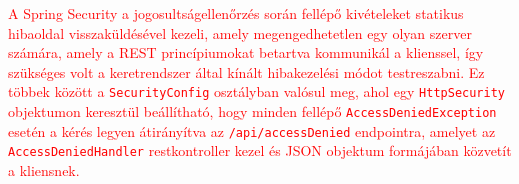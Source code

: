 \textcolor{red}{A Spring Security a jogosultságellenőrzés során fellépő kivételeket statikus hibaoldal visszaküldésével kezeli, amely megengedhetetlen egy olyan szerver számára, amely a REST princípiumokat betartva kommunikál a klienssel, így szükséges volt a keretrendszer által kínált hibakezelési módot testreszabni. Ez többek között a \texttt{SecurityConfig} osztályban valósul meg, ahol egy \texttt{HttpSecurity} objektumon keresztül beállítható, hogy minden fellépő \texttt{AccessDeniedException} esetén a kérés legyen átirányítva az \texttt{/api/accessDenied} endpointra, amelyet az \texttt{AccessDeniedHandler} restkontroller kezel és JSON objektum formájában közvetít a kliensnek.}

